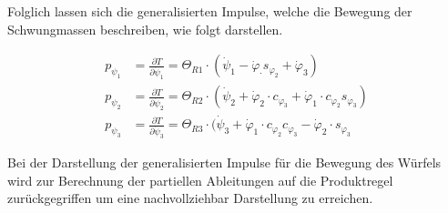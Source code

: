 Folglich lassen sich die generalisierten Impulse, welche die Bewegung der Schwungmassen beschreiben, wie folgt darstellen.

\begin{align}
p_{\psi_1} & = \frac{\partial T}{\partial \dot{\psi}_1} = \Theta_{R1} \cdot (\dot{\psi}_1 - \dot{\varphi}_ \cdot s_{\varphi_2} + \dot{\varphi}_3)
\\
p_{\psi_2} & = \frac{\partial T}{\partial \dot{\psi}_2} = \Theta_{R2} \cdot (\dot{\psi}_2 + \dot{\varphi}_2 \cdot c_{\varphi_3} + \dot{\varphi}_1 \cdot c_{\varphi_2}s_{\varphi_3})
\\
p_{\psi_3} & = \frac{\partial T}{\partial \dot{\psi}_3} = \Theta_{R3} \cdot (\dot{\psi}_3 + \dot{\varphi}_1 \cdot c_{\varphi_2}c_{\varphi_3} - \dot{\varphi}_2 \cdot s_{\varphi_3}
\end{align}

Bei der Darstellung der generalisierten Impulse für die Bewegung des Würfels wird zur Berechnung der partiellen Ableitungen auf die Produktregel zurückgegriffen um eine nachvollziehbar Darstellung zu erreichen.

